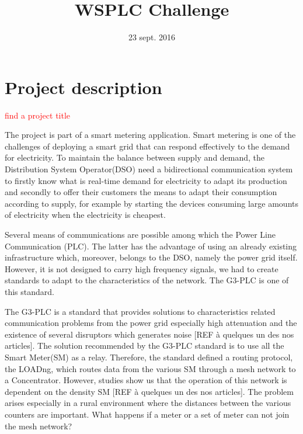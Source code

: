 \documentclass[a4paper,12pt]{article}
\title{WSPLC Challenge}
\author{}
\date{23 sept. 2016}
\newcommand{\TODO}[1]{\textcolor{red}{\framebox{TODO:} #1}}
\begin{document}
\maketitle
\tableofcontents
\newpage

\section{Project description}

\TODO{find a project title}

The project is part of a smart metering application. Smart
metering is one of the challenges of deploying a smart grid
that can respond effectively to the demand for
electricity. To maintain the balance between supply and
demand, the Distribution System Operator(DSO) need a
bidirectional communication system to firstly know what is
real-time demand for electricity to adapt its production and
secondly to offer their customers the means to adapt their
consumption according to supply, for example by starting the
devices consuming large amounts of electricity when the
electricity is cheapest.

Several means of communications are possible among which the
Power Line Communication (PLC). The latter has the advantage
of using an already existing infrastructure which, moreover,
belongs to the DSO, namely the power grid itself. However,
it is not designed to carry high frequency signals, we had
to create standards to adapt to the characteristics of the
network. The G3-PLC is one of this standard.

The G3-PLC is a standard that provides solutions to
characteristics related communication problems from the
power grid especially high attenuation and the existence of
several disruptors which generates noise [REF à quelques un
  des nos articles]. The solution recommended by the G3-PLC
standard is to use all the Smart Meter(SM) as a
relay. Therefore, the standard defined a routing protocol,
the LOADng, which routes data from the various SM through a
mesh network to a Concentrator. However, studies show us
that the operation of this network is dependent on the
density SM [REF à quelques un des nos articles]. The problem
arises especially in a rural environment where the distances
between the various counters are important. What happens if
a meter or a set of meter can not join the mesh network?
\end{document}
